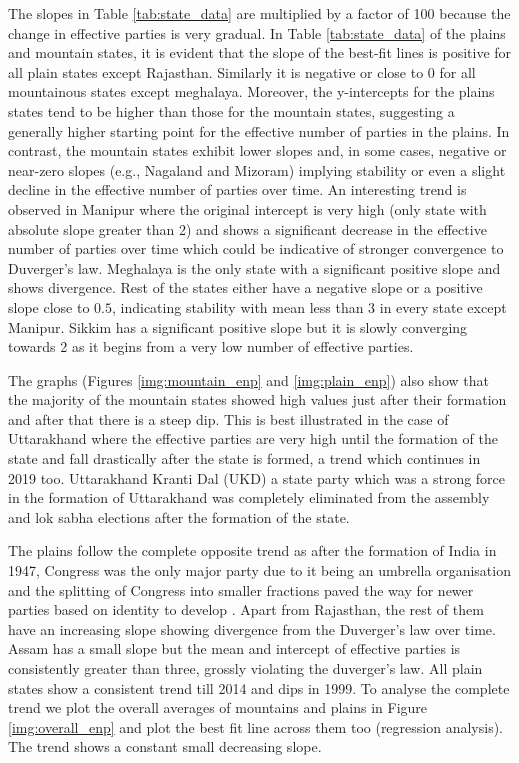 The slopes in Table \ref{tab:state_data} are multiplied by a factor of 100 because the change in effective parties is very gradual. In Table \ref{tab:state_data} of the plains and mountain states, it is evident that the slope of the best-fit lines is positive for all plain states except Rajasthan. Similarly it is negative or close to 0 for all mountainous states except meghalaya. Moreover, the y-intercepts for the plains states tend to be higher than those for the mountain states, suggesting a generally higher starting point for the effective number of parties in the plains. In contrast, the mountain states exhibit lower slopes and, in some cases, negative or near-zero slopes (e.g., Nagaland and Mizoram) implying stability or even a slight decline in the effective number of parties over time.  An interesting trend is observed in Manipur where the original intercept is very high (only state with absolute slope greater than 2) and shows a significant decrease in the effective number of parties over time which could be indicative of stronger convergence to Duverger’s law. Meghalaya is the only state with a significant positive slope and shows divergence. Rest of the states either have a negative slope or a positive slope close to $0.5$, indicating stability with mean less than 3 in every state except Manipur. Sikkim has a significant positive slope but it is slowly converging towards 2 as it begins from a very low number of effective parties.

\vspace{0.3cm}

The graphs (Figures \ref{img:mountain_enp} and \ref{img:plain_enp}) also show that the majority of the mountain states showed high values just after their formation and after that there is a steep dip. This is best illustrated in the case of Uttarakhand where the effective parties are very high until the formation of the state and fall drastically after the state is formed, a trend which continues in 2019 too. Uttarakhand Kranti Dal (UKD) a state party which was a strong force in the formation of Uttarakhand was completely eliminated from the assembly and lok sabha elections after the formation of the state.  

\vspace{0.3cm}

The plains follow the complete opposite trend as after the formation of India in 1947, Congress was the only major party due to it being an umbrella organisation and the splitting of Congress into smaller fractions paved the way for newer parties based on identity to develop \citep{kothari1967india}. Apart from Rajasthan, the rest of them have an increasing slope showing divergence from the Duverger’s law over time. Assam has a small slope but the mean and intercept of effective parties is consistently greater than three, grossly violating the duverger’s law. All plain states show a consistent trend till 2014 and dips in 1999. To analyse the complete trend we plot the overall averages of mountains and plains in Figure \ref{img:overall_enp} and plot the best fit line across them too (regression analysis). The trend shows a constant small decreasing slope.

